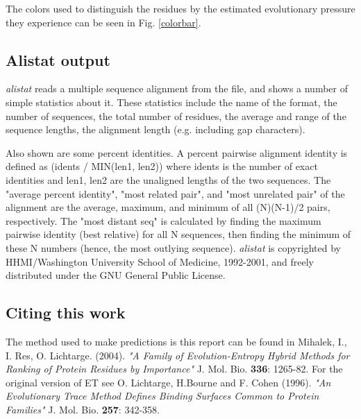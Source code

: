 The colors used to distinguish the residues by the estimated  evolutionary pressure they experience can
be seen in Fig. \ref{colorbar}.

\subsection{Alistat output}
\emph{alistat} reads a multiple sequence alignment from the file, and shows a number of simple statistics about it. 
These statistics include the name of the format, the number of sequences, 
the total number of residues, the average and range of the sequence lengths, the alignment length (e.g. including gap characters).

Also shown are some percent identities. A percent pairwise alignment identity is defined as (idents / MIN(len1, len2)) 
where idents is the number of exact identities and len1, len2 are the unaligned lengths of the two sequences. 
The "average percent identity", "most related pair", and "most unrelated pair" of the alignment are the average,
 maximum, and minimum of all (N)(N-1)/2 pairs, respectively. 
The "most distant seq" is calculated by finding the maximum pairwise identity 
(best relative) for all N sequences, then finding the minimum of these N numbers (hence, the most outlying sequence). 
\emph{alistat} is copyrighted by  HHMI/Washington University School of Medicine, 1992-2001,
and freely distributed under the GNU General Public License.


\subsection{Citing this work}
The method used to make predictions is this report can be found in 
Mihalek, I., I. Res, O. Lichtarge. (2004).
\emph {"A Family of Evolution-Entropy Hybrid Methods for Ranking of Protein Residues by Importance" }
J. Mol. Bio. {\bf 336}: 1265-82.
For the original version of ET see
O. Lichtarge, H.Bourne and F. Cohen  (1996).
\emph {"An Evolutionary Trace Method Defines Binding Surfaces Common to Protein Families" }
J. Mol. Bio. {\bf 257}: 342-358.
